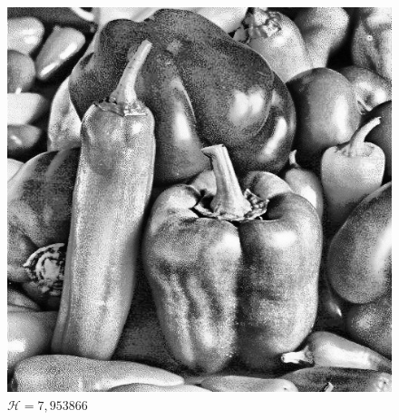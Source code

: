 \documentclass[usenames,dvipsnames]{beamer}
\begin{document}
\begin{frame}
\begin{columns}[onlytextwidth]
\begin{column}{.45\textwidth}
\begin{figure}
		  \includegraphics[width=\textwidth]{graphics/peppers_gray_hc.jpg}
		  \caption{$\mathscr{H}=7,953866$}
		\end{figure}
\end{column}
\end{columns}

\end{frame}
\end{document}

